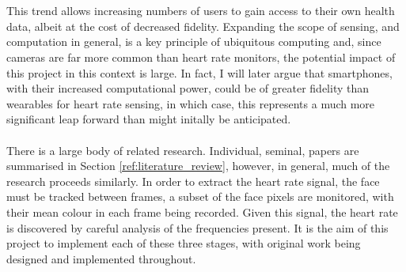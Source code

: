 \\\\
This trend allows increasing numbers of users to gain access to their own health data, albeit at the cost of decreased fidelity.
Expanding the scope of sensing, and computation in general, is a key principle of ubiquitous computing and, since cameras are far more common than heart rate monitors, the potential impact of this project in this context is large. 
In fact, I will later argue that smartphones, with their increased computational power, 
could be of greater fidelity than wearables for heart rate sensing, in which case, this represents a much more significant 
leap forward than might initally be anticipated.
\\\\
There is a large body of related research.
Individual, seminal, papers are summarised in Section \ref{ref:literature_review}, however, in general, much of the research proceeds similarly. 
In order to extract the heart rate signal, the face must be tracked between frames, a subset of the face pixels are monitored, with their mean colour in each frame being recorded.
Given this signal, the heart rate is discovered by careful analysis of the frequencies present. 
It is the aim of this project to implement each of these three stages, with original work being designed and implemented throughout. 




